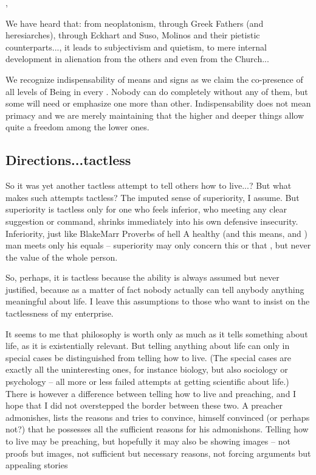 \sep


We have heard that: from neoplatonism, through Greek Fathers (and heresiarches),
through Eckhart and Suso, Molinos and their pietistic counterparts..., it leads
to subjectivism and quietism, to mere internal development in alienation from
the others and even from the Church...


We recognize indispensability of  means and signs as we claim the
co-presence of all levels of Being in every . Nobody can do
completely without any of them, but some will need or emphasize one more than
other. Indispensability does not mean primacy and we are merely maintaining that
the higher and deeper things allow quite a freedom among the lower ones. 


\subsection{Directions...tactless}

\pa
So it was yet another tactless attempt to tell others how to live...?  But what
makes such attempts tactless? The imputed sense of superiority, I assume. But
superiority is tactless only for one who feels inferior, who meeting any clear
suggestion or command, shrinks immediately into his own defensive insecurity.
Inferiority, just like \citet{shame is pride's cloke.}{BlakeMarr}{ Proverbs of
hell } A healthy (and this means,  and
) man meets only his equals -- superiority may only concern this or
that , but never the value of the whole person.

So, perhaps, it is tactless because the ability is always assumed but never justified,
because as a matter of fact nobody actually can tell anybody anything meaningful
about life. I leave this assumptions to those who want to insist on the
tactlessness of my enterprise.

It seems to me that philosophy is worth only as much as it tells something about
life, as it is existentially relevant. But telling anything about life can only
in special cases be distinguished from telling how to live. (The special cases
are exactly all the uninteresting ones, for instance biology, but also sociology
or psychology -- all more or less failed attempts at getting scientific about
life.) There is however a difference between telling how to live and preaching,
and I hope that I did not overstepped the border between these two. A preacher
admonishes, lists the reasons and tries to convince, himself convinced (or
perhaps not?) that he possesses all the sufficient reasons for his
admonishons. Telling how to live may be preaching, but hopefully it may also be
showing images -- not proofs but images, not sufficient but necessary
reasons, not forcing arguments but appealing stories


